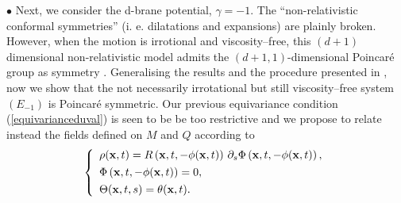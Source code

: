 \documentclass[11pt,a4paper]{article}
\begin{document}
$\bullet$ Next, we consider the d-brane potential, $\gamma=-1$. The
``non-relativistic conformal symmetries'' (i. e. dilatations and
expansions) are plainly broken.
However, when the motion is irrotional and viscosity--free, this
$(d+1)$ dimensional non-relativistic model
 admits the $(d+1,1)$-dimensional Poincar\'e group
 as symmetry \cite{BoHo, JAC, BJ}. Generalising the results and
 the procedure presented in
\cite{HH}, now we show that the not necessarily irrotational but
still viscosity--free system
$\displaystyle{({E}_{-1})}$ is Poincar\'e
symmetric. Our previous equivariance condition (\ref{equivarianceduval})
is seen to be be too restrictive and we propose to
 relate  instead
the fields defined on $M$ and $Q$
according to
\begin{eqnarray}
\left\lbrace
\begin{array}{l}
\rho({\bf x},t)=R\left({\bf x},t,-\phi({\bf
x},t)\right)\,\partial_s\Phi\left({\bf x},t,-\phi({\bf
x},t)\right),\\[1,2mm]
\Phi\left({\bf x},t,-\phi({\bf x},t)\right)=0,\\[1.2mm]
\Theta({\bf x},t,s)=\theta({\bf x},t).
\end{array}
\right.
\label{equivariancehh}
\end{eqnarray}
\end{document}
